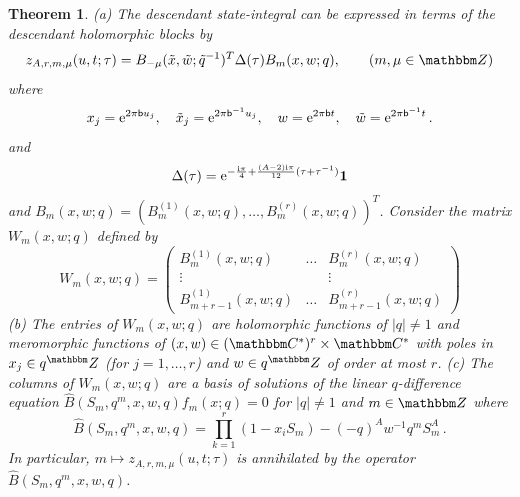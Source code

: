 \documentclass[12pt,reqno]{amsart}
\newtheorem{theorem}{Theorem}
\theoremstyle{definition}
\def\BZ{\mathbbm Z}
\def\BC{\mathbbm C}
\def\tq{\tilde{q}}
\def\tx{\tilde{x}}
\def\tw{\tilde{w}}
\def\bb{\mathsf{b}}
\def\ri{\mathrm{i}}
\def\tx{\tilde{x}}
\def\re{{\rm e}}
\def\ri{{\rm i}}
\def\Bhat{\widehat{B}}
\def\md{\mathbf}
\begin{document}
\begin{theorem}
  \label{thm.Zfac}
  \rm{(a)} The descendant state-integral can be expressed in terms of
  the descendant holomorphic blocks by
\begin{equation}
  \label{Z-fac}
  z_{A,r,m,\mu}(u,t;\tau) 
  =
  B_{-\mu}(\tx,\tw;\tq^{-1})^T \Delta(\tau) B_m(x,w;q),
  \qquad (m, \mu \in \BZ)
\end{equation}
where 
\begin{equation}
  x_j = \re^{2\pi \bb u_j},\quad \tx_j =
  \re^{2\pi \bb^{-1}u_j},\quad
  w = \re^{2\pi\bb t},\quad \tw = \re^{2\pi\bb^{-1}t} \,.
\end{equation}
and 
\begin{equation}
\label{Dr}
\Delta(\tau) =
\re^{-\frac{\ri\pi}{4}+\frac{(A-2)\ri\pi}{12}(\tau+\tau^{-1})}\md{1}
\end{equation}
and $B_m(x,w;q)=(B^{(1)}_m(x,w;q), \dots, B^{(r)}_m(x,w;q))^T$. 
Consider the matrix $W_m(x,w;q)$ defined by
\begin{equation}
  \label{Wrm}
  W_m(x,w;q) =
  \begin{pmatrix}
    B^{(1)}_{m}(x,w;q) & \ldots & B^{(r)}_{m}(x,w;q) \\
    \vdots & & \vdots \\
    B^{(1)}_{m+r-1}(x,w;q) & \ldots & B^{(r)}_{m+r-1}(x,w;q)
  \end{pmatrix}
\end{equation}
\rm{(b)} The entries of $W_m(x,w;q)$ are holomorphic
functions of $|q| \neq 1$ and meromorphic functions of $(x,w) \in
(\BC^*)^r \times \BC^*$
with poles in $x_j \in q^\BZ$ (for $j=1,\dots,r$) and
$w \in q^\BZ$ of order at most $r$. 
  \newline
  \rm{(c)} The columns of $W_m(x,w;q)$ are a basis of solutions of the
  linear $q$-difference equation $\Bhat(S_m,q^m,x,w,q) f_m(x;q)=0$ for
  $|q| \neq 1$ and $m \in \BZ$ where 
    \begin{equation}
  \label{bkm}
  \Bhat(S_m,q^m,x,w,q) = \prod_{k=1}^r(1-x_i S_m) - (-q)^A w^{-1} q^{m} S_m^A \,.
  \end{equation}
  In particular, $m \mapsto z_{A,r,m,\mu}(u,t;\tau)$ is annihilated by
  the operator $\Bhat(S_m,q^m,x,w,q)$.
\end{theorem}
\end{document}
